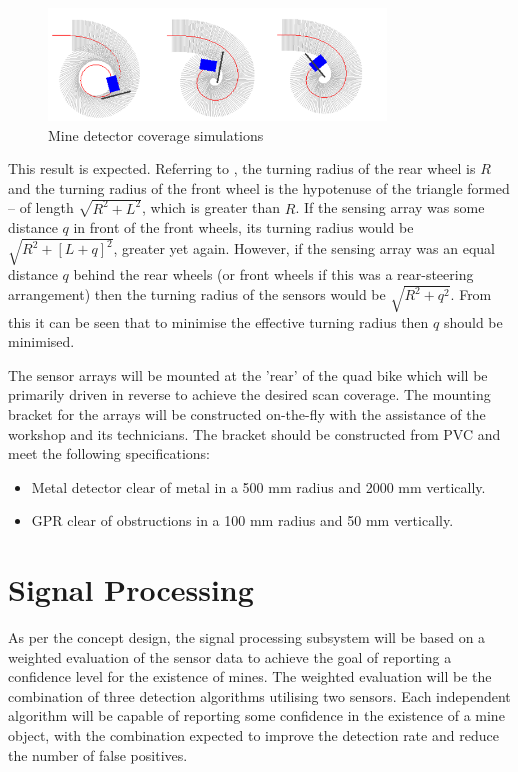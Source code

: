 \documentclass[main.tex]{subfiles}
\begin{document}
\begin{figure}[ht]
\includegraphics[width=0.8\textwidth]{5-DetailedDesign/Detector_Coverage.png}
\centering
\caption{Mine detector coverage simulations} 
\end{figure}
This result is expected. Referring to , the turning radius of the rear wheel is $R$ and the turning radius of the front wheel is the hypotenuse of the triangle formed – of length $\sqrt{R^2 + L^2}$, which is greater than $R$. If the sensing array was some distance $q$ in front of the front wheels, its turning radius would be $\sqrt{R^2 + [L+q]^2}$, greater yet again. However, if the sensing array was an equal distance $q$ behind the rear wheels (or front wheels if this was a rear-steering arrangement) then the turning radius of the sensors would be $\sqrt{R^2 + q^2}$. From this it can be seen that to minimise the effective turning radius then $q$ should be minimised.

The sensor arrays will be mounted at the 'rear' of the quad bike which will be primarily driven in reverse to achieve the desired scan coverage. The mounting bracket for the arrays will be constructed on-the-fly with the assistance of the workshop and its technicians. The bracket should be constructed from PVC and meet the following specifications:
\begin{itemize}
\item Metal detector clear of metal in a 500 mm radius and 2000 mm vertically.
\item GPR clear of obstructions in a 100 mm radius and 50 mm vertically.
\end{itemize}

\section{Signal Processing}


As per the concept design, the signal processing subsystem will be based on a weighted evaluation of the sensor data to achieve the goal of reporting a confidence level for the existence of mines.
The weighted evaluation will be the combination of three detection algorithms utilising two sensors. Each independent algorithm will be capable of reporting some confidence in the existence of a mine object, with the combination expected to improve the detection rate and reduce the number of false positives.
\end{document}
